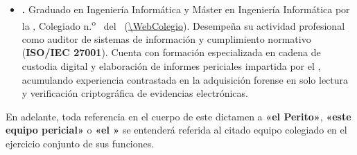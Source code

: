 \begin{itemize}[leftmargin=1.4em, itemsep=0.6em]
	\item \begin{sloppypar}
		\textbf{\PeritoCuatro.} Graduado en Ingeniería Informática y Máster en Ingeniería Informática por la \UniversidadPerito, Colegiado n.\textsuperscript{o} \NumColegiadoCuatro\ del \ColegioProfesional\ (\url{\WebColegio}). Desempeña su actividad profesional como auditor de sistemas de información y cumplimiento normativo (\textbf{ISO/IEC 27001}). Cuenta con formación especializada en cadena de custodia digital y elaboración de informes periciales impartida por el \ColegioProfesional, acumulando experiencia contrastada en la adquisición forense en solo lectura y verificación criptográfica de evidencias electrónicas.
	\end{sloppypar}
\end{itemize}

En adelante, toda referencia en el cuerpo de este dictamen a \textbf{«el Perito»}, \textbf{«este equipo pericial»} o \textbf{«el \GrupoPracticas»} se entenderá referida al citado equipo colegiado en el ejercicio conjunto de sus funciones.